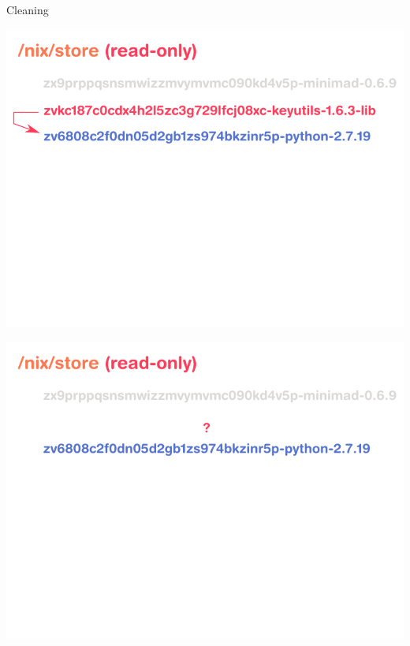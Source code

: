 \documentclass[aspectratio=169]{beamer}
\begin{document}
\begin{frame}{Cleaning}
{\begin{center}
            \includegraphics[height=0.98\textheight]{img/schema-nix-store-cleaning-3.pdf}
        \end{center}
    }
     {
        \begin{center}
            \includegraphics[height=0.98\textheight]{img/schema-nix-store-cleaning-4.pdf}
        \end{center}
     }


\end{frame}
\end{document}
